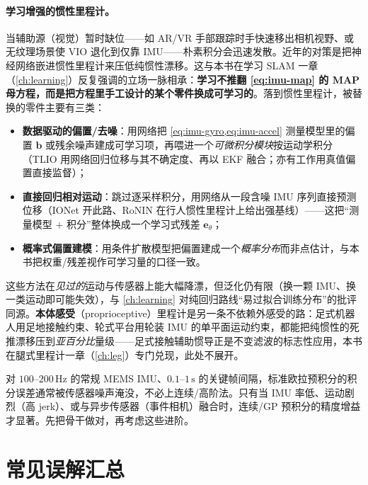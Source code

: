 \paragraph{学习增强的惯性里程计。}
当辅助源（视觉）暂时缺位——如 AR/VR 手部跟踪时手快速移出相机视野、或无纹理场景使 VIO 退化到仅靠 IMU——朴素积分会迅速发散。近年的对策是把神经网络嵌进惯性里程计来压低纯惯性漂移\cite{carlone2026handbook}。这与本书在学习 SLAM 一章（\cref{ch:learning}）反复强调的立场一脉相承：\textbf{学习不推翻 \cref{eq:imu-map} 的 MAP 母方程，而是把方程里手工设计的某个零件换成可学习的}。落到惯性里程计，被替换的零件主要有三类：
\begin{itemize}
  \item \textbf{数据驱动的偏置/去噪}：用网络把 \cref{eq:imu-gyro,eq:imu-accel} 测量模型里的偏置 $\mathbf b$ 或残余噪声建成可学习项，再喂进一个\emph{可微积分模块}按运动学积分（TLIO\cite{liu2020tlio} 用网络回归位移与其不确定度、再以 EKF 融合；亦有工作用真值偏置直接监督）；
  \item \textbf{直接回归相对运动}：跳过逐采样积分，用网络从一段含噪 IMU 序列直接预测位移（IONet\cite{chen2018ionet} 开此路、RoNIN\cite{herath2020ronin} 在行人惯性里程计上给出强基线）——这把“测量模型 $+$ 积分”整体换成一个学习式残差 $\mathbf e_\theta$；
  \item \textbf{概率式偏置建模}：用条件扩散模型把偏置建成一个\emph{概率分布}而非点估计\cite{carlone2026handbook}，与本书把权重/残差视作可学习量的口径一致。
\end{itemize}
这些方法在\emph{见过的}运动与传感器上能大幅降漂，但泛化仍有限（换一颗 IMU、换一类运动即可能失效），与 \cref{ch:learning} 对纯回归路线“易过拟合训练分布”的批评同源。\textbf{本体感受}（proprioceptive）里程计是另一条不依赖外感受的路：足式机器人用足地接触约束、轮式平台用轮装 IMU 的单平面运动约束，都能把纯惯性的死推漂移压到\emph{亚百分比}量级——足式接触辅助惯导正是不变滤波的标志性应用，本书在腿式里程计一章（\cref{ch:leg}）专门兑现，此处不展开。

\begin{insight}[什么时候需要超越欧拉预积分]\label{ins:beyond-euler}
对 $100$--$200\,\mathrm{Hz}$ 的常规 MEMS IMU、$0.1$--$1\,\mathrm s$ 的关键帧间隔，标准欧拉预积分的积分误差通常被传感器噪声淹没，不必上连续/高阶法。只有当 IMU 率低、运动剧烈（高 jerk）、或与异步传感器（事件相机）融合时，连续/GP 预积分的精度增益才显著。先把骨干做对，再考虑这些进阶。
\end{insight}

\section*{常见误解汇总}

